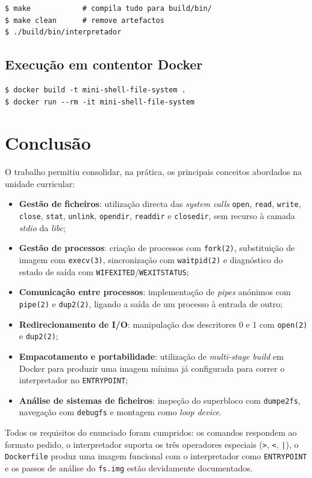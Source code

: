 \documentclass[11pt,a4paper]{article}
\begin{document}
\begin{lstlisting}[style=shellstyle]
$ make            # compila tudo para build/bin/
$ make clean      # remove artefactos
$ ./build/bin/interpretador
\end{lstlisting}

\subsection{Execução em contentor Docker}

\begin{lstlisting}[style=shellstyle]
$ docker build -t mini-shell-file-system .
$ docker run --rm -it mini-shell-file-system
\end{lstlisting}

\section{Conclusão}

O trabalho permitiu consolidar, na prática, os principais conceitos abordados na unidade curricular:

\begin{itemize}[leftmargin=1.5em]
    \item \textbf{Gestão de ficheiros}: utilização directa das \textit{system calls} \texttt{open}, \texttt{read}, \texttt{write}, \texttt{close}, \texttt{stat}, \texttt{unlink}, \texttt{opendir}, \texttt{readdir} e \texttt{closedir}, sem recurso à camada \textit{stdio} da \textit{libc};
    \item \textbf{Gestão de processos}: criação de processos com \texttt{fork(2)}, substituição de imagem com \texttt{execv(3)}, sincronização com \texttt{waitpid(2)} e diagnóstico do estado de saída com \texttt{WIFEXITED}/\texttt{WEXITSTATUS};
    \item \textbf{Comunicação entre processos}: implementação de \textit{pipes} anónimos com \texttt{pipe(2)} e \texttt{dup2(2)}, ligando a saída de um processo à entrada de outro;
    \item \textbf{Redirecionamento de I/O}: manipulação dos descritores 0 e 1 com \texttt{open(2)} e \texttt{dup2(2)};
    \item \textbf{Empacotamento e portabilidade}: utilização de \textit{multi-stage build} em Docker para produzir uma imagem mínima já configurada para correr o interpretador no \texttt{ENTRYPOINT};
    \item \textbf{Análise de sistemas de ficheiros}: inspeção do superbloco com \texttt{dumpe2fs}, navegação com \texttt{debugfs} e montagem como \textit{loop device}.
\end{itemize}

Todos os requisitos do enunciado foram cumpridos: os comandos respondem ao formato pedido, o interpretador suporta os três operadores especiais (\texttt{>}, \texttt{<}, \texttt{|}), o \texttt{Dockerfile} produz uma imagem funcional com o interpretador como \texttt{ENTRYPOINT} e os passos de análise do \texttt{fs.img} estão devidamente documentados.
\end{document}
